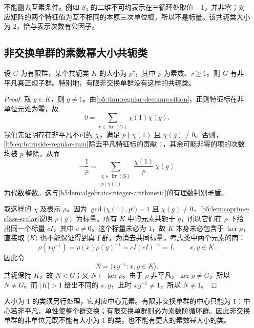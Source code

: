 不能删去互素条件。例如 \(S_3\) 的二维不可约表示在三循环处取值 \(-1\)，并非零；对应矩阵的两个特征值为互不相同的本原三次单位根，所以不是标量。该共轭类大小为 \(2\)，恰与表示次数有公因子。

\subsection{非交换单群的素数幂大小共轭类}
\label{b5:subsec:0505:03}

\begin{proposition}\label{b5:prop:prime-power-class-normal-subgroup}
	设 \(G\) 为有限群，某个共轭类 \(K\) 的大小为 \(p^r\)，其中 \(p\) 为素数、\(r\ge1\)。则 \(G\) 有非平凡真正规子群。特别地，有限非交换单群没有这样的共轭类。
\end{proposition}
\begin{proof}
	取 \(g\in K\)，则 \(g\ne1\)。由\cref{b5:thm:regular-decomposition}，正则特征标在非单位元处为零，故
	\begin{equation}\label{b5:eq:burnside-regular-sum}
		0=\sum_{\chi\in\operatorname{Irr}(G)}\chi(1)\chi(g).
	\end{equation}
	我们先证明存在非平凡不可约 \(\chi\)，满足 \(p\nmid\chi(1)\) 且 \(\chi(g)\ne0\)。否则，\eqref{b5:eq:burnside-regular-sum}除去平凡特征标的贡献 \(1\)，其余可能非零的项的次数均被 \(p\) 整除，从而
	\[
		-\frac1p =\sum_{\substack{\chi\in\operatorname{Irr}(G)\\p\mid\chi(1)}} \frac{\chi(1)}p\,\chi(g)
	\]
	为代数整数。这与\cref{b5:lem:algebraic-integer-arithmetic}的有理数判别矛盾。

	取这样的 \(\chi\) 及表示 \(\rho\)。因为 \(\gcd\bigl(\chi(1),p^r\bigr)=1\) 且 \(\chi(g)\ne0\)，\cref{b5:lem:coprime-class-scalar}说明 \(\rho(g)\) 为标量。所有 \(K\) 中的元素共轭于 \(g\)，所以它们在 \(\rho\) 下给出同一个标量 \(cI\)，其中 \(c\ne0\)。这个标量未必为 \(1\)，故 \(K\) 本身未必包含于 \(\ker\rho\)，直接取 \(\langle K\rangle\) 也不能保证得到真子群。为消去共同标量，考虑类中两个元素的商：
	\[
		\rho(xy^{-1})=\rho(x)\rho(y)^{-1}=cI(cI)^{-1}=I, \qquad x,y\in K.
	\]
	因此令
	\[
		N=\langle xy^{-1}:x,y\in K\rangle.
	\]
	共轭保持 \(K\)，故 \(N\triangleleft G\)；又 \(N\subset\ker\rho\)。由于 \(\rho\) 非平凡，\(\ker\rho\ne G\)，所以 \(N\ne G\)。而 \(|K|>1\) 给出不同的 \(x,y\)，此时 \(xy^{-1}\ne1\)，所以 \(N\ne1\)。
\end{proof}

大小为 \(1\) 的类须另行处理，它对应中心元素。有限非交换单群的中心只能为 \(1\)：中心若非平凡，单性使整个群交换；有限交换单群则必为素数阶循环群。因此非交换单群的非单位元既不能有大小为 \(1\) 的类，也不能有更大的素数幂大小的类。

